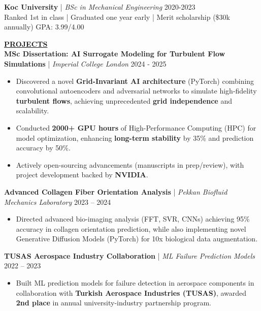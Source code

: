 \documentclass{article}
\newlength{\remaining}
\renewcommand{\section}[1]{
  \vspace{1.0em}\setlength{\remaining}{\textwidth-\widthof{\uppercase{#1}}}
    \noindent\underline{\fontsize{10}{15}\bfseries\uppercase{#1}\hspace*{\remaining}} \\
}
\renewcommand{\subsection}[3]{
    \noindent\textbf{#1} | \emph{#2} \hfill #3  
}
\begin{document}
    \vspace{0.25em}

    \subsection{Koc University}{BSc in Mechanical Engineering}{2020-2023} \\
    Ranked 1st in class | Graduated one year early | Merit scholarship (\$30k annually) \hfill GPA: 3.99/4.00


    \section{Projects}
    \subsection{MSc Dissertation: AI Surrogate Modeling for Turbulent Flow Simulations}{Imperial College London}{2024 - 2025} 
    \begin{itemize} 
        \item Discovered a novel \textbf{Grid-Invariant AI architecture} (PyTorch) combining convolutional autoencoders and adversarial networks to simulate high-fidelity \textbf{turbulent flows}, achieving unprecedented \textbf{grid independence} and scalability.
        \item Conducted \textbf{2000+ GPU hours} of High-Performance Computing (HPC) for model optimization, enhancing \textbf{long-term stability} by 35\% and prediction accuracy by 50\%.
        \item Actively open-sourcing advancements (manuscripts in prep/review), with project development backed by \textbf{NVIDIA}.
    \end{itemize}

    \subsection{Advanced Collagen Fiber Orientation Analysis}{Pekkan Biofluid Mechanics Laboratory}{2023 – 2024}
    \begin{itemize}
        \item Directed advanced bio-imaging analysis (FFT, SVR, CNNs) achieving 95\% accuracy in collagen orientation prediction, while also implementing novel Generative Diffusion Models (PyTorch) for 10x biological data augmentation.
    \end{itemize}

    \subsection{TUSAS Aerospace Industry Collaboration}{ML Failure Prediction Models}{2022 – 2023}
    \begin{itemize}
        \item Built ML prediction models for failure detection in aerospace components in collaboration with \textbf{Turkish Aerospace Industries (TUSAS)}, awarded \textbf{2nd place} in annual university-industry partnership program.
    \end{itemize}
\end{document}
